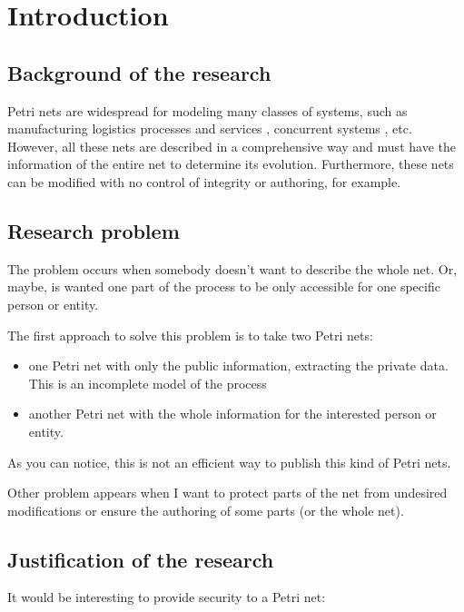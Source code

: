 
\chapter{Introduction} %

\label{Chapter1} %



\section{Background of the research}
Petri nets are widespread for modeling many
classes of systems, such as manufacturing logistics processes and services
\citep{SM-Jimenez2004143,SM-Guasch2002}, concurrent systems \citep{EPN-Jensen2009},
etc. However, all these nets are described in a comprehensive way and must have the information of the entire net to determine
its evolution.
Furthermore, these nets can be modified with no control of integrity or authoring,
for example. 
\section{Research problem}
The problem occurs when somebody doesn't want to describe the whole net.
Or, maybe, is wanted one part of the process to be only accessible for one
specific person or entity.


The first approach to solve this problem is to
take two Petri nets:


\begin{itemize}
\item
one Petri net with only the public information, extracting the private data. This
is an incomplete model of the process
\item
another Petri net with the whole information
for the interested person or entity.

\end{itemize}  

As you can notice, this is not an efficient way to publish this kind of Petri
nets.

Other problem appears when I want to protect parts of the net from undesired
modifications or ensure the authoring of some parts (or the whole net).


\section{Justification of the research}
It would be interesting to provide security to a Petri net:


